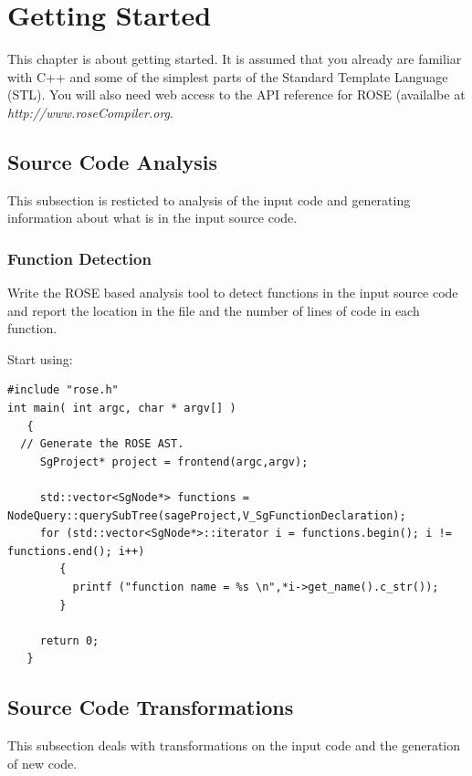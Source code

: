 \chapter{Getting Started}

  This chapter is about getting started.  It is assumed that
you already are familiar with C++ and some of the simplest parts
of the Standard Template Language (STL). You will also need web 
access to the API reference for ROSE (availalbe
at {\em http://www.roseCompiler.org}.

\section{Source Code Analysis}
   This subsection is resticted to analysis of the input code
and generating information about what is in the input source code.

\subsection{Function Detection}
   Write the ROSE based analysis tool to detect functions in the input source code
and report the location in the file and the number of lines of code in each function.

Start using:
\begin{verbatim}
#include "rose.h"
int main( int argc, char * argv[] )
   {
  // Generate the ROSE AST.
     SgProject* project = frontend(argc,argv);

     std::vector<SgNode*> functions = NodeQuery::querySubTree(sageProject,V_SgFunctionDeclaration);
     for (std::vector<SgNode*>::iterator i = functions.begin(); i != functions.end(); i++)
        {
          printf ("function name = %s \n",*i->get_name().c_str());
        }

     return 0;
   }

\end{verbatim}

\section{Source Code Transformations}
   This subsection deals with transformations on the 
input code and the generation of new code.

